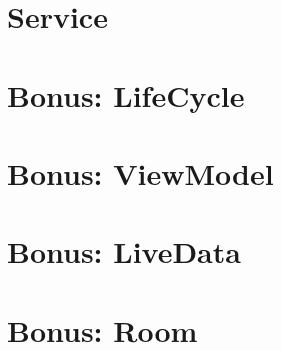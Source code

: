 \documentclass[a4paper]{article}
\begin{document}
\begin{multicols}{2}
        \section{Service}
        \section{Bonus: LifeCycle}
        \section{Bonus: ViewModel}
        \section{Bonus: LiveData}
        \section{Bonus: Room}

    \end{multicols}
\end{document}
